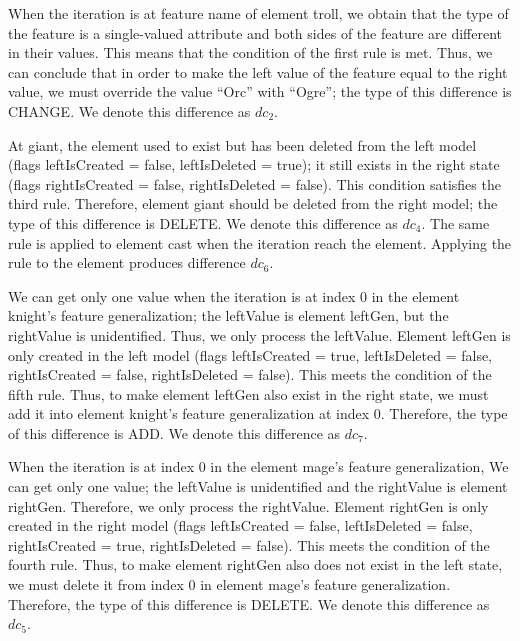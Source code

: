When the iteration is at feature \textsf{name} of element \textsf{troll}, we obtain that the type of the feature is a single-valued attribute and both sides of the feature are different in their values. This means that the condition of the first rule is met. Thus, we can conclude that in order to make the left value of the feature equal to the right value, we must override the value ``Orc'' with ``Ogre''; the type of this difference is \textsf{CHANGE}. We denote this difference as $dc_{2}$.

At \textsf{giant}, the element used to exist but has been deleted from the left model (flags \textsf{leftIsCreated} = false, \textsf{leftIsDeleted} = true); it still exists in the right state (flags \textsf{rightIsCreated} = false, \textsf{rightIsDeleted} = false). This condition satisfies the third rule. Therefore, element \textsf{giant} should be deleted from the right model; the type of this difference is \textsf{DELETE}. We denote this difference as $dc_{4}$. The same rule is applied to element \textsf{cast} when the iteration reach the element. Applying the rule to the element produces difference $dc_{6}$.

We can get only one value when the iteration is at index 0 in the element \textsf{knight}'s feature \textsf{generalization}; the \textsf{leftValue} is element \textsf{leftGen}, but the \textsf{rightValue} is unidentified. Thus, we only process the \textsf{leftValue}. Element \textsf{leftGen} is only created in the left model (flags \textsf{leftIsCreated} = true, \textsf{leftIsDeleted} = false, \textsf{rightIsCreated} = false, \textsf{rightIsDeleted} = false). This meets the condition of the fifth rule. Thus, to make element \textsf{leftGen} also exist in the right state, we must add it into element \textsf{knight}'s feature \textsf{generalization} at index 0. Therefore, the type of this difference is \textsf{ADD}. We denote this difference as $dc_{7}$.

When the iteration is at index 0 in the element \textsf{mage}'s feature \textsf{generalization}, We can get only one value; the \textsf{leftValue} is unidentified and the \textsf{rightValue} is element \textsf{rightGen}. Therefore, we only process the \textsf{rightValue}. Element \textsf{rightGen} is only created in the right model (flags \textsf{leftIsCreated} = false, \textsf{leftIsDeleted} = false, \textsf{rightIsCreated} = true, \textsf{rightIsDeleted} = false). This meets the condition of the fourth rule. Thus, to make element \textsf{rightGen} also does not exist in the left state, we must delete it from index 0 in element \textsf{mage}'s feature \textsf{generalization}. Therefore, the type of this difference is \textsf{DELETE}. We denote this difference as $dc_{5}$.

